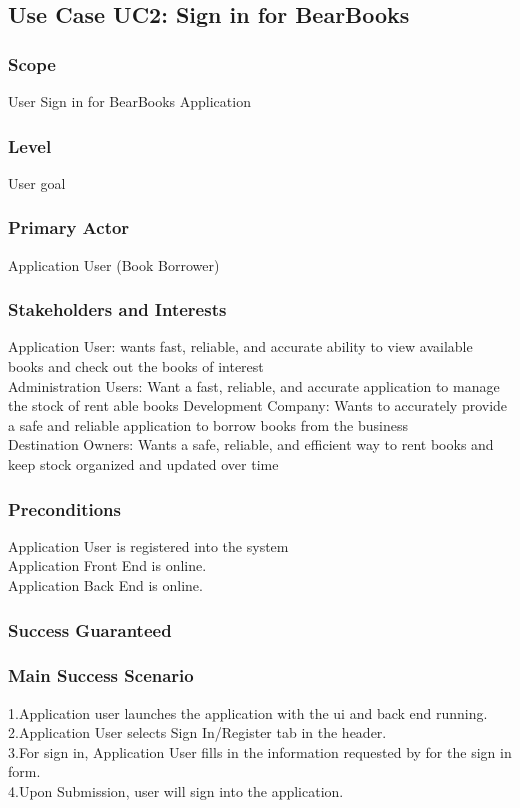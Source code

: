 \documentclass{article}
\begin{document}
	\subsection{Use Case UC2: Sign in for BearBooks}
	
	\subsubsection{\textbf{Scope}} 
	User Sign in for BearBooks Application
	\subsubsection{\textbf{Level}} 
	User goal
	\subsubsection{\textbf{Primary Actor}} 
	Application User (Book Borrower)
	\subsubsection{\textbf{Stakeholders and Interests}}
	Application User: wants fast, reliable, and accurate ability to view available books and check out the books of interest \\
	Administration Users: Want a fast, reliable, and accurate application to manage the stock of rent able books
	Development Company: Wants to accurately provide a safe and reliable application to borrow books from the business \\
	Destination Owners: Wants a safe, reliable, and efficient way to rent books and keep stock organized and updated over time \\
	\subsubsection{\textbf{Preconditions}}
	Application User is registered into the system \\
	Application Front End is online. \\
	Application Back End is online. \\
	
	\subsubsection{\textbf{Success Guaranteed}}
	
	\subsubsection{\textbf{Main Success Scenario}}
	1.Application user launches the application with the ui and back end running. \\
	2.Application User selects Sign In/Register tab in the header. \\
	3.For sign in, Application User fills in the information requested by for the sign in form. \\
	4.Upon Submission, user will sign into the application. \\
	
\end{document}
